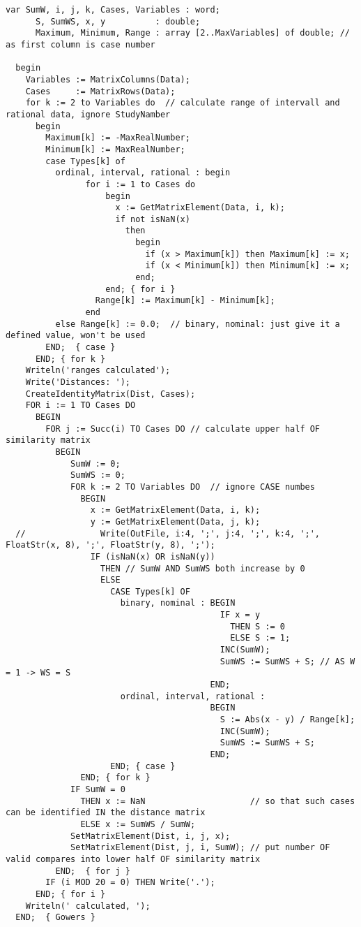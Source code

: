 \begin{refsection}
\begin{lstlisting}[caption=Distance matrix]
  var SumW, i, j, k, Cases, Variables : word;
      S, SumWS, x, y          : double;
      Maximum, Minimum, Range : array [2..MaxVariables] of double; // as first column is case number

  begin
    Variables := MatrixColumns(Data);
    Cases     := MatrixRows(Data);
    for k := 2 to Variables do  // calculate range of intervall and rational data, ignore StudyNamber
      begin
        Maximum[k] := -MaxRealNumber;
        Minimum[k] := MaxRealNumber;
        case Types[k] of
          ordinal, interval, rational : begin
                for i := 1 to Cases do
                    begin
                      x := GetMatrixElement(Data, i, k);
                      if not isNaN(x)
                        then
                          begin
                            if (x > Maximum[k]) then Maximum[k] := x;
                            if (x < Minimum[k]) then Minimum[k] := x;
                          end;
                    end; { for i }
                  Range[k] := Maximum[k] - Minimum[k];
                end
          else Range[k] := 0.0;  // binary, nominal: just give it a defined value, won't be used
        END;  { case }
      END; { for k }
    Writeln('ranges calculated');
    Write('Distances: ');
    CreateIdentityMatrix(Dist, Cases);
    FOR i := 1 TO Cases DO
      BEGIN
        FOR j := Succ(i) TO Cases DO // calculate upper half OF similarity matrix
          BEGIN
             SumW := 0;
             SumWS := 0;
             FOR k := 2 TO Variables DO  // ignore CASE numbes
               BEGIN
                 x := GetMatrixElement(Data, i, k);
                 y := GetMatrixElement(Data, j, k);
  //               Write(OutFile, i:4, ';', j:4, ';', k:4, ';', FloatStr(x, 8), ';', FloatStr(y, 8), ';');
                 IF (isNaN(x) OR isNaN(y))
                   THEN // SumW AND SumWS both increase by 0
                   ELSE
                     CASE Types[k] OF
                       binary, nominal : BEGIN
                                           IF x = y
                                             THEN S := 0
                                             ELSE S := 1;
                                           INC(SumW);
                                           SumWS := SumWS + S; // AS W = 1 -> WS = S
                                         END;
                       ordinal, interval, rational :
                                         BEGIN
                                           S := Abs(x - y) / Range[k];
                                           INC(SumW);
                                           SumWS := SumWS + S;
                                         END;
                     END; { case }
               END; { for k }
             IF SumW = 0
               THEN x := NaN                     // so that such cases can be identified IN the distance matrix
               ELSE x := SumWS / SumW;
             SetMatrixElement(Dist, i, j, x);
             SetMatrixElement(Dist, j, i, SumW); // put number OF valid compares into lower half OF similarity matrix
          END;  { for j }
        IF (i MOD 20 = 0) THEN Write('.');
      END; { for i }
    Writeln(' calculated, ');
  END;  { Gowers }


\end{lstlisting}
\end{refsection}
